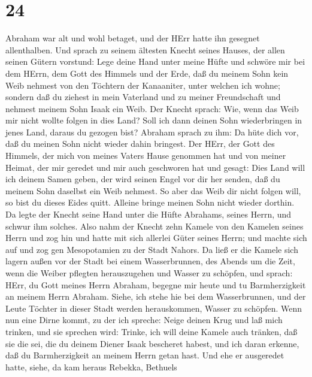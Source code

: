 \hypertarget{section-23}{%
\section{24}\label{section-23}}

 Abraham war alt und wohl betaget, und der HErr hatte ihn
gesegnet allenthalben.  Und sprach zu seinem ältesten Knecht
seines Hauses, der allen seinen Gütern vorstund: Lege deine Hand unter
meine Hüfte  und schwöre mir bei dem HErrn, dem Gott des
Himmels und der Erde, daß du meinem Sohn kein Weib nehmest von den
Töchtern der Kanaaniter, unter welchen ich wohne;  sondern
daß du ziehest in mein Vaterland und zu meiner Freundschaft und nehmest
meinem Sohn Isaak ein Weib.  Der Knecht sprach: Wie, wenn
das Weib mir nicht wollte folgen in dies Land? Soll ich dann deinen Sohn
wiederbringen in jenes Land, daraus du gezogen bist? 
Abraham sprach zu ihm: Da hüte dich vor, daß du meinen Sohn nicht wieder
dahin bringest.  Der HErr, der Gott des Himmels, der mich
von meines Vaters Hause genommen hat und von meiner Heimat, der mir
geredet und mir auch geschworen hat und gesagt: Dies Land will ich
deinem Samen geben, der wird seinen Engel vor dir her senden, daß du
meinem Sohn daselbst ein Weib nehmest.  So aber das Weib dir
nicht folgen will, so bist du dieses Eides quitt. Alleine bringe meinen
Sohn nicht wieder dorthin.  Da legte der Knecht seine Hand
unter die Hüfte Abrahams, seines Herrn, und schwur ihm solches.
 Also nahm der Knecht zehn Kamele von den Kamelen seines
Herrn und zog hin und hatte mit sich allerlei Güter seines Herrn; und
machte sich auf und zog gen Mesopotamien zu der Stadt Nahors.
 Da ließ er die Kamele sich lagern außen vor der Stadt bei
einem Wasserbrunnen, des Abends um die Zeit, wenn die Weiber pflegten
herauszugehen und Wasser zu schöpfen,  und sprach: HErr, du
Gott meines Herrn Abraham, begegne mir heute und tu Barmherzigkeit an
meinem Herrn Abraham.  Siehe, ich stehe hie bei dem
Wasserbrunnen, und der Leute Töchter in dieser Stadt werden
herauskommen, Wasser zu schöpfen.  Wenn nun eine Dirne
kommt, zu der ich spreche: Neige deinen Krug und laß mich trinken, und
sie sprechen wird: Trinke, ich will deine Kamele auch tränken, daß sie
die sei, die du deinem Diener Isaak bescheret habest, und ich daran
erkenne, daß du Barmherzigkeit an meinem Herrn getan hast. 
Und ehe er ausgeredet hatte, siehe, da kam heraus Rebekka, Bethuels
